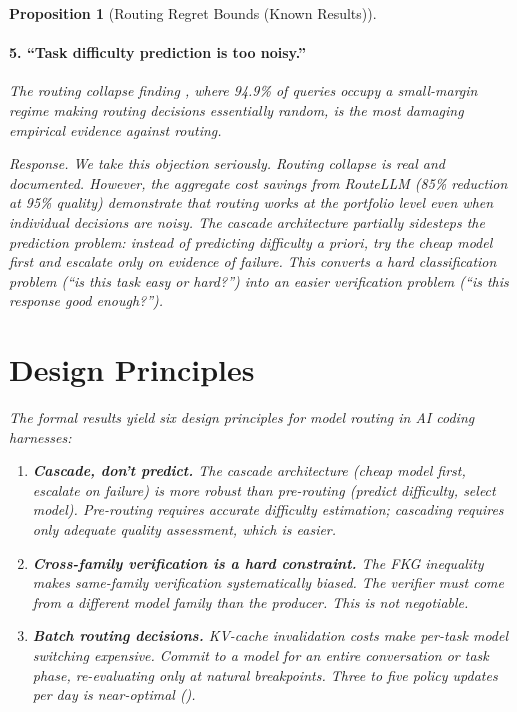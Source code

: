 \documentclass[11pt, a4paper, logo, copyright]{googledeepmind}
\newtheorem{proposition}{Proposition}[section]
\begin{document}
\begin{proposition}[Routing Regret Bounds (Known Results)]
\paragraph{5. ``Task difficulty prediction is too noisy.''} The routing collapse finding \citep{routingcollapse2026}, where 94.9\% of queries occupy a small-margin regime making routing decisions essentially random, is the most damaging empirical evidence against routing.

\emph{Response.} We take this objection seriously. Routing collapse is real and documented. However, the aggregate cost savings from RouteLLM (85\% reduction at 95\% quality) demonstrate that routing works at the portfolio level even when individual decisions are noisy. The cascade architecture partially sidesteps the prediction problem: instead of predicting difficulty \emph{a priori}, try the cheap model first and escalate only on evidence of failure. This converts a hard classification problem (``is this task easy or hard?'') into an easier verification problem (``is this response good enough?'').


\section{Design Principles}
\label{sec:principles}

The formal results yield six design principles for model routing in AI coding harnesses:

\begin{enumerate}
\item \textbf{Cascade, don't predict.} The cascade architecture (cheap model first, escalate on failure) is more robust than pre-routing (predict difficulty, select model). Pre-routing requires accurate difficulty estimation; cascading requires only adequate quality assessment, which is easier.

\item \textbf{Cross-family verification is a hard constraint.} The FKG inequality makes same-family verification systematically biased. The verifier must come from a different model family than the producer. This is not negotiable.

\item \textbf{Batch routing decisions.} KV-cache invalidation costs make per-task model switching expensive. Commit to a model for an entire conversation or task phase, re-evaluating only at natural breakpoints. Three to five policy updates per day is near-optimal ().


\end{enumerate}
\end{proposition}
\end{document}
